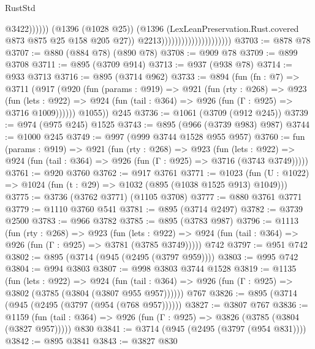 \begin{lexlean}{RustStd}
\begin{coremodule}
                                                          @3422))))))
                                              (@1396 (@1028 @25))
                                              (@1396
                                                (LexLeanPreservation.Rust.covered
                                                  @873
                                                  @875
                                                  @25
                                                  @158
                                                  @205
                                                  @27))
                                              @2213)))))))))))))))))))))
@3703 := @878 @78
@3707 := @880 (@884 @78) (@890 @78)
@3708 := @909 @78
@3709 := @899 @3708
@3711 := @895 (@3709 @914)
@3713 := @937 (@938 @78)
@3714 := @933 @3713
@3716 := @895 (@3714 @962)
@3733 := @894
    (fun (fn : @7) =>
    @3711
      (@917
        (@920
          (fun (params : @919) =>
          @921
            (fun (rty : @268) =>
            @923
              (fun (lets : @922) =>
              @924 (fun (tail : @364) => @926 (fun (Γ : @925) => @3716 @1009))))))
        @1055))
    @245
@3736 := @1061 (@3709 (@912 @245))
@3739 := @974 (@975 @245) @1525
@3743 := @895 (@966 (@3739 @983) @987)
@3744 := @1000 @245
@3749 := @997 (@999 @3744 @1528 @955 @957)
@3760 := fun (params : @919) =>
  @921
    (fun (rty : @268) =>
    @923
      (fun (lets : @922) =>
      @924 (fun (tail : @364) => @926 (fun (Γ : @925) => @3716 (@3743 @3749)))))
@3761 := @920 @3760
@3762 := @917 @3761
@3771 := @1023 (fun (U : @1022) => @1024 (fun (t : @29) => @1032 (@895 (@1038 @1525 @913) @1049)))
@3775 := @3736 (@3762 @3771) (@1105 @3708)
@3777 := @880 @3761 @3771
@3779 := @1110 @3760 @541
@3781 := @895 (@3714 @2497)
@3782 := @3739 @2500
@3783 := @966 @3782
@3785 := @895 (@3783 @987)
@3796 := @1113
    (fun (rty : @268) =>
    @923
      (fun (lets : @922) =>
      @924 (fun (tail : @364) => @926 (fun (Γ : @925) => @3781 (@3785 @3749)))))
    @742
@3797 := @951 @742
@3802 := @895 (@3714 (@945 (@2495 (@3797 @959))))
@3803 := @995 @742
@3804 := @994 @3803
@3807 := @998 @3803 @3744 @1528
@3819 := @1135
    (fun (lets : @922) =>
    @924 (fun (tail : @364) => @926 (fun (Γ : @925) => @3802 (@3785 (@3804 (@3807 @955 @957))))))
    @767
@3826 := @895 (@3714 (@945 (@2495 (@3797 (@954 (@768 @957))))))
@3827 := @3807 @767
@3836 := @1159
    (fun (tail : @364) => @926 (fun (Γ : @925) => @3826 (@3785 (@3804 (@3827 @957)))))
    @830
@3841 := @3714 (@945 (@2495 (@3797 (@954 @831))))
@3842 := @895 @3841
@3843 := @3827 @830

\end{coremodule}
\end{lexlean}
